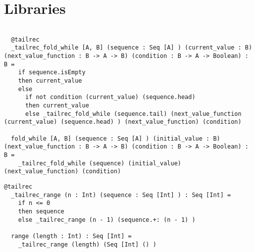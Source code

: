 \chapter{Libraries}

\begin{lstlisting}[label={lst:fold}]

  @tailrec
  _tailrec_fold_while [A, B] (sequence : Seq [A] ) (current_value : B) (next_value_function : B -> A -> B) (condition : B -> A -> Boolean) : B =
    if sequence.isEmpty
    then current_value
    else
      if not condition (current_value) (sequence.head)
      then current_value
      else _tailrec_fold_while (sequence.tail) (next_value_function (current_value) (sequence.head) ) (next_value_function) (condition)

  fold_while [A, B] (sequence : Seq [A] ) (initial_value : B) (next_value_function : B -> A -> B) (condition : B -> A -> Boolean) : B =
    _tailrec_fold_while (sequence) (initial_value) (next_value_function) (condition)
\end{lstlisting}

\begin{lstlisting}[label={lst:range}]
  @tailrec
  _tailrec_range (n : Int) (sequence : Seq [Int] ) : Seq [Int] =
    if n <= 0
    then sequence
    else _tailrec_range (n - 1) (sequence.+: (n - 1) )

  range (length : Int) : Seq [Int] =
    _tailrec_range (length) (Seq [Int] () )
\end{lstlisting}


